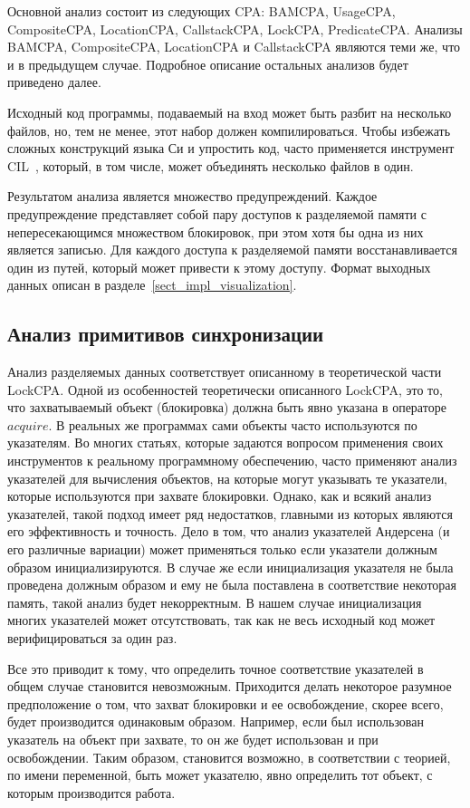Основной анализ состоит из следующих CPA: BAMCPA, UsageCPA, CompositeCPA, LocationCPA, CallstackCPA, LockCPA, PredicateCPA.
Анализы BAMCPA, CompositeCPA, LocationCPA и CallstackCPA являются теми же, что и в предыдущем случае.
Подробное описание остальных анализов будет приведено далее.

Исходный код программы, подаваемый на вход может быть разбит на несколько файлов, но, тем не менее, этот набор должен компилироваться.
Чтобы избежать сложных конструкций языка Си и упростить код, часто применяется инструмент CIL~\cite{CIL}, который, в том числе, может объединять несколько файлов в один.

Результатом анализа является множество предупреждений.
Каждое предупреждение представляет собой пару доступов к разделяемой памяти с непересекающимся множеством блокировок, при этом хотя бы одна из них является записью.
Для каждого доступа к разделяемой памяти восстанавливается один из путей, который может привести к этому доступу.
Формат выходных данных описан в разделе~\ref{sect_impl_visualization}.

\subsection{Анализ примитивов синхронизации}
Анализ разделяемых данных соответствует описанному в теоретической части LockCPA.
Одной из особенностей теоретически описанного LockCPA, это то, что захватываемый объект (блокировка) должна быть явно указана в операторе $acquire$.
В реальных же программах сами объекты часто используются по указателям.
Во многих статьях, которые задаются вопросом применения своих инструментов к реальному программному обеспечению, часто применяют анализ указателей для вычисления объектов, на которые могут указывать те указатели, которые используются при захвате блокировки.
Однако, как и всякий анализ указателей, такой подход имеет ряд недостатков, главными из которых являются его эффективность и точность.
Дело в том, что анализ указателей Андерсена (и его различные вариации) может применяться только если указатели должным образом инициализируются.
В случае же если инициализация указателя не была проведена должным образом и ему не была поставлена в соответствие некоторая память, такой анализ будет некорректным.
В нашем случае инициализация многих указателей может отсутствовать, так как не весь исходный код может верифицироваться за один раз.

Все это приводит к тому, что определить точное соответствие указателей в общем случае становится невозможным.
Приходится делать некоторое разумное предположение о том, что захват блокировки и ее освобождение, скорее всего, будет производится одинаковым образом.
Например, если был использован указатель на объект при захвате, то он же будет использован и при освобождении.
Таким образом, становится возможно, в соответствии с теорией, по имени переменной, быть может указателю, явно определить тот объект, с которым производится работа.

